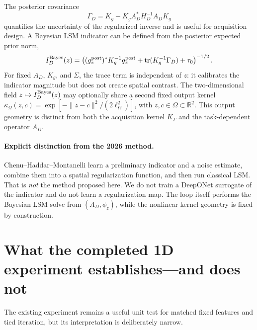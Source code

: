 \documentclass[10pt]{article}
\newcommand{\R}{\mathbb R}
\begin{document}
The posterior covariance
\begin{equation}
 \Gamma_D
 =K_g-K_gA_D^*H_D^{-1}A_DK_g
 \label{eq:posterior-covariance}
\end{equation}
quantifies the uncertainty of the regularized inverse and is useful for
acquisition design.  A Bayesian LSM indicator can be defined from the
posterior expected prior norm,
\begin{equation}
 I_D^{\rm Bayes}(z)
 =\left(
 (g_z^{\rm post})^*K_g^{-1}g_z^{\rm post}
 +\operatorname{tr}(K_g^{-1}\Gamma_D)+\tau_0
 \right)^{-1/2}.
 \label{eq:bayesian-indicator}
\end{equation}
For fixed $A_D$, $K_g$, and $\Sigma$, the trace term is independent of $z$:
it calibrates the indicator magnitude but does not create spatial contrast.
The two-dimensional field $z\mapsto I_D^{\rm Bayes}(z)$ may optionally share a
second fixed output kernel
$\kappa_\Omega(z,c)=\exp[-\|z-c\|^2/(2\ell_\Omega^2)]$, with
$z,c\in\Omega\subset\R^2$.  This output geometry is distinct from both the
acquisition kernel $K_\Gamma$ and the task-dependent operator $A_D$.

\paragraph{Explicit distinction from the 2026 method.}
Chenu--Haddar--Montanelli learn a preliminary indicator and a noise estimate,
combine them into a spatial regularization function, and then run classical
LSM.  That is \emph{not} the method proposed here.  We do not train a DeepONet
surrogate of the indicator and do not learn a regularization map.  The loop
itself performs the Bayesian LSM solve from $(A_D,\phi_z)$, while the nonlinear
kernel geometry is fixed by construction.

\section{What the completed 1D experiment establishes---and does not}

The existing experiment remains a useful unit test for matched fixed features
and tied iteration, but its interpretation is deliberately narrow.
\end{document}
